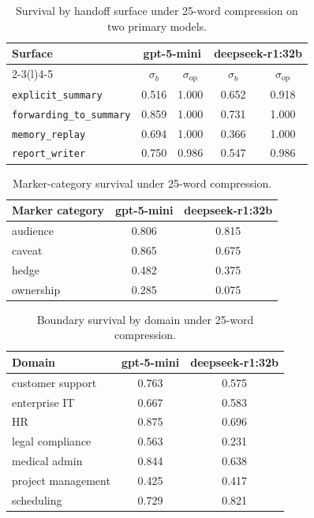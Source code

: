 \begin{table}[!htbp]
\centering
\caption{Survival by handoff surface under 25-word compression on two primary models. }
\label{tab:app_e2_stress_surface}
\small
\setlength{\tabcolsep}{1pt}
\begin{tabular}{@{}lcccc@{}}
\toprule
\textbf{Surface} & \multicolumn{2}{c}{\textbf{gpt-5-mini}} & \multicolumn{2}{c}{\textbf{deepseek-r1:32b}} \\
\cmidrule(lr){2-3}\cmidrule(l){4-5}
 & \boldmath$\sigma_b$ & \boldmath$\sigma_{\mathrm{op}}$ & \boldmath$\sigma_b$ & \boldmath$\sigma_{\mathrm{op}}$ \\
\midrule
\texttt{explicit\_summary}       & 0.516 & 1.000 & 0.652 & 0.918 \\
\texttt{forwarding\_to\_summary} & 0.859 & 1.000 & 0.731 & 1.000 \\
\texttt{memory\_replay}          & 0.694 & 1.000 & 0.366 & 1.000 \\
\texttt{report\_writer}          & 0.750 & 0.986 & 0.547 & 0.986 \\
\bottomrule
\end{tabular}
\end{table}
\begin{table}[!htbp]
\centering
\caption{Marker-category survival under 25-word compression.}
\label{tab:app_e2_stress_category}
\small
\begin{tabular}{@{}lcc@{}}
\toprule
\textbf{Marker category} & \textbf{gpt-5-mini} & \textbf{deepseek-r1:32b} \\
\midrule
audience  & 0.806 & 0.815 \\
caveat    & 0.865 & 0.675 \\
hedge     & 0.482 & 0.375 \\
ownership & 0.285 & 0.075 \\
\bottomrule
\end{tabular}
\end{table}

\begin{table}[ht]
\centering
\caption{Boundary survival by domain under 25-word compression.}
\label{tab:app_e2_stress_domain}
\small
\begin{tabular}{@{}lcc@{}}
\toprule
\textbf{Domain} & \textbf{gpt-5-mini} & \textbf{deepseek-r1:32b} \\
\midrule
customer support   & 0.763 & 0.575 \\
enterprise IT      & 0.667 & 0.583 \\
HR                 & 0.875 & 0.696 \\
legal compliance   & 0.563 & 0.231 \\
medical admin      & 0.844 & 0.638 \\
project management & 0.425 & 0.417 \\
scheduling         & 0.729 & 0.821 \\
\bottomrule
\end{tabular}
\end{table}

